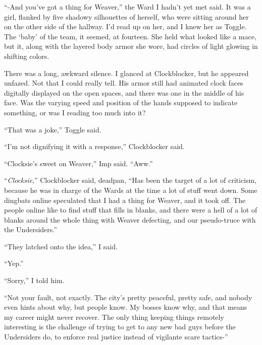 ``-And you've got a thing for Weaver,'' the Ward I hadn't yet met said.  It was a girl, flanked by five shadowy silhouettes of herself, who were sitting around her on the other side of the hallway.  I'd read up on her, and I knew her as Toggle.  The `baby' of the team, it seemed, at fourteen.  She held what looked like a mace, but it, along with the layered body armor she wore, had circles of light glowing in shifting colors.



There was a long, awkward silence.  I glanced at Clockblocker, but he appeared unfazed.  Not that I could really tell.  His armor still had animated clock faces digitally displayed on the open spaces, and there was one in the middle of his face.  Was the varying speed and position of the hands supposed to indicate something, or was I reading too much into it?



``That was a joke,'' Toggle said.



``I'm not dignifying it with a response,'' Clockblocker said.



``Clocksie's sweet on Weaver,'' Imp said.  ``Aww.''



``\emph{Clocksie},'' Clockblocker said, deadpan, ``Has been the target of a lot of criticism, because he was in charge of the Wards at the time a lot of stuff went down.  Some dingbats online speculated that I had a thing for Weaver, and it took off.  The people online like to find stuff that fills in blanks, and there were a hell of a lot of blanks around the whole thing with Weaver defecting, and our pseudo-truce with the Undersiders.''



``They latched onto the idea,'' I said.



``Yep.''



``Sorry,'' I told him.



``Not your fault, not exactly.  The city's pretty peaceful, pretty safe, and nobody even hints about why, but people know.  My bosses know why, and that means my career might never recover.  The only thing keeping things remotely interesting is the challenge of trying to get to any new bad guys before the Undersiders do, to enforce real justice instead of vigilante scare tactics-''



